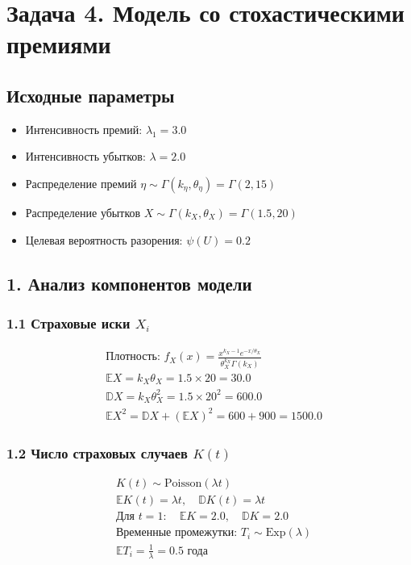 \documentclass[12pt]{article}
\begin{document}
	\section*{Задача 4. Модель со стохастическими премиями}
	\subsection*{Исходные параметры}
	\begin{itemize}
		\item Интенсивность премий: $\lambda_1 = 3.0$
		\item Интенсивность убытков: $\lambda = 2.0$
		\item Распределение премий $\eta \sim\Gamma(k_\eta, \theta_\eta) =\Gamma(2, 15)$
		\item Распределение убытков $X \sim\Gamma(k_X, \theta_X) = \Gamma(1.5, 20)$
		\item Целевая вероятность разорения: $\psi(U) = 0.2$
	\end{itemize}
	
	\subsection*{1. Анализ компонентов модели}
	
	\subsubsection*{1.1 Страховые иски $X_i$}
	\begin{equation*}
		\begin{aligned}
			&\text{Плотность: } f_X(x) = \frac{x^{k_X-1}e^{-x/\theta_X}}{\theta_X^{k_X}\Gamma(k_X)} \\
			&\mathbb{E}X = k_X\theta_X = 1.5 \times 20 = 30.0 \\
			&\mathbb{D}X = k_X\theta_X^2 = 1.5 \times 20^2 = 600.0 \\
			&\mathbb{E}X^2 = \mathbb{D}X + (\mathbb{E}X)^2 = 600 + 900 = 1500.0
		\end{aligned}
	\end{equation*}
	
	\subsubsection*{1.2 Число страховых случаев $K(t)$}
	\begin{equation*}
		\begin{aligned}
			&K(t) \sim \text{Poisson}(\lambda t) \\
			&\mathbb{E}K(t) = \lambda t, \quad \mathbb{D}K(t) = \lambda t \\
			&\text{Для } t=1: \quad \mathbb{E}K = 2.0, \quad \mathbb{D}K = 2.0 \\
			&\text{Временные промежутки: } T_i \sim \text{Exp}(\lambda) \\
			&\mathbb{E}T_i = \frac{1}{\lambda} = 0.5 \text{ года}
		\end{aligned}
	\end{equation*}
	
\end{document}

